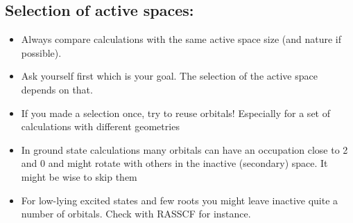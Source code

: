 \subsection{Selection of active spaces: }
\begin{itemize}
\item Always compare calculations with the same active space size (and nature if possible). 
\item Ask yourself first which is your goal. The selection of the active space depends on that. 
\item If you made a selection once, try to reuse orbitals! Especially for a set of
calculations with different geometries
\item In ground state calculations many orbitals can have an occupation close to 2 and 0 and 
might rotate with others in the inactive (secondary) space. It might be wise to skip them 
\item For low-lying excited states and few roots you might leave inactive quite a number of 
orbitals. Check with RASSCF for instance.
\end{itemize}



